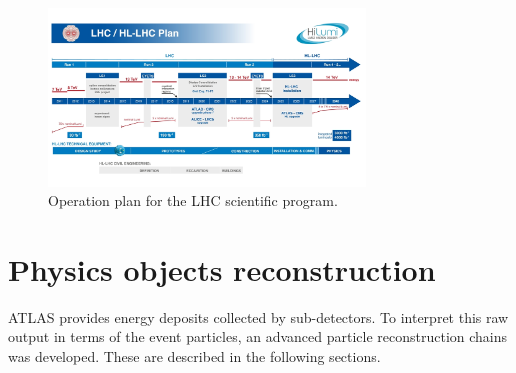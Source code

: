\begin{figure}[htbp]
    \centering
    \includegraphics[width=0.75\textwidth]{Ch2/Img/HL-LHC-January-2021_small.jpg}
    \caption{Operation plan for the LHC scientific program.}
    \label{fig:chap2:Upgrad}
\end{figure}

\section{Physics objects reconstruction}
\label{chap2:Objects}
ATLAS provides energy deposits collected by sub-detectors. To interpret this raw output in terms of the event particles, an advanced particle reconstruction chains was developed. These are described in the following sections.


